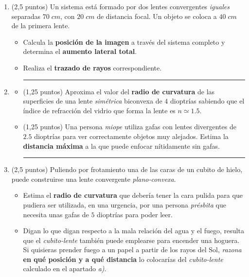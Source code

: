 \documentclass[a4paper,14pt]{extarticle}
\title{\textbf{	}}
\date{}
\newcommand{\halmos}{
\vspace*{-2ex}

\begin{flushright}
\rule{1mm}{2.5mm} \end{flushright}
\vspace*{-3ex}

}
\renewcommand{\qed}{\halmos}
\begin{document}



\begin{enumerate}
  \setlength\itemsep{1.5em}
  
   \item (2,5 puntos)	Un sistema está formado por dos lentes convergentes \textit{iguales} separadas $70\;cm$, con $20\;cm$ de distancia focal. Un objeto se coloca a $40\;cm$ de la primera lente. 
		\begin{itemize}
			\item[a)] Calcula la \textbf{posición de la imagen} a través del sistema completo y determina el \textbf{aumento lateral total}.
			\item[b)]  Realiza el \textbf{trazado de rayos} correspondiente.			%
			
			 \qed
		\end{itemize}
    
    
    \item  
		\begin{itemize}
			\item[a)] (1,25 puntos) Aproxima el valor del \textbf{radio de curvatura} de las superficies de una lente \textit{simétrica} biconvexa de $4$ dioptrías sabiendo que el índice de refracción del vidrio que forma la lente es $n\simeq 1.5$.
			\item[b)] (1,25 puntos) Una persona \textit{miope} utiliza gafas con lentes divergentes de $2.5$ dioptrías  para ver correctamente objetos muy alejados.  Estima la \textbf{distancia máxima} a la que puede enfocar nítidamente sin gafas.
			\qed
		\end{itemize}				

    
    \item (2,5 puntos)  Puliendo  por  frotamiento  una  de  las  caras  de  un  cubito  de  hielo,  puede construirse una lente convergente \textit{plano-convexa}.
		\begin{itemize}
			\item[a)] Estima el  \textbf{radio  de  curvatura}  que debería tener la  cara  pulida para que pudiera ser utilizada, en una urgencia, por una persona \textit{présbita} que necesita unas gafas de $5$ dioptrías para poder leer.
			\item[b)]  Digan lo que digan respecto a la mala relación del agua y el fuego, resulta que el \textit{cubito-lente}  también puede emplearse   para   encender una hoguera. Si quisieras prender fuego a un papel a partir de los rayos del Sol, \textit{razona} \textbf{en qué posición y a qué distancia} lo colocarías del \textit{cubito-lente} calculado en el apartado \textit{a)}.
			\end{itemize}
				

\end{enumerate}
\end{document}
